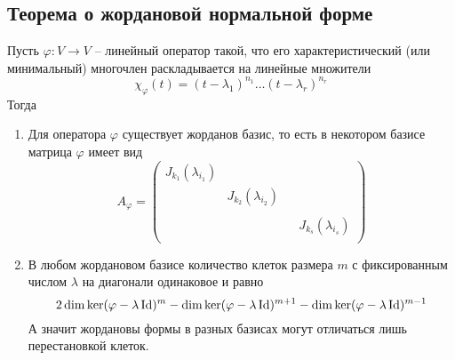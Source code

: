 \subsection{Теорема о жордановой нормальной форме}

\begin{claim}
\label{claim::JNF}
Пусть $\varphi\colon V\to V$ -- линейный оператор такой, что его характеристический (или минимальный) многочлен раскладывается на линейные множители
\[
\chi_\varphi(t) = (t - \lambda_1)^{n_1} \ldots (t - \lambda_r)^{n_r}
\]
Тогда
\begin{enumerate}
\item Для оператора $\varphi$ существует жорданов базис, то есть в некотором базисе матрица $\varphi$ имеет вид
\[
A_\varphi = 
\begin{pmatrix}
{J_{k_1}(\lambda_{i_1})}&{}&{}&{}\\
{}&{J_{k_2}(\lambda_{i_2})}&{}&{}\\
{}&{}&{}&{}\\
{}&{}&{}&{J_{k_s}(\lambda_{i_s})}\\
\end{pmatrix}
\]

\item В любом жордановом базисе количество клеток размера $m$ с фиксированным числом $\lambda$ на диагонали одинаковое и равно
\[
2\dim \ker (\varphi - \lambda\operatorname{Id})^m - \dim \ker (\varphi - \lambda\operatorname{Id})^{m+1} - \dim \ker (\varphi - \lambda\operatorname{Id})^{m-1}
\]
А значит жордановы формы в разных базисах могут отличаться лишь перестановкой клеток.
\end{enumerate}
\end{claim}
